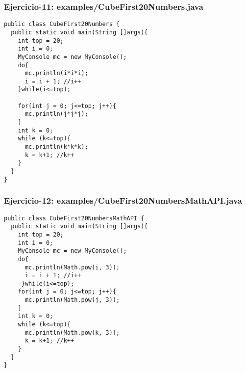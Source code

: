 \documentclass[xcolor=dvipsnames,dvip,notes=show,handout,table]{beamer}
\begin{document}


\begin{frame}[fragile]
\frametitle{Ejercicio-11: examples/CubeFirst20Numbers.java}
\tiny
\begin{lstlisting}
public class CubeFirst20Numbers {
  public static void main(String []args){
    int top = 20;
    int i = 0;
    MyConsole mc = new MyConsole();
    do{
      mc.println(i*i*i);
      i = i + 1; //i++
    }while(i<=top);

    for(int j = 0; j<=top; j++){
      mc.println(j*j*j);
    }
    int k = 0;
    while (k<=top){
      mc.println(k*k*k);
      k = k+1; //k++
    }
  }
}
\end{lstlisting}
\end{frame}




\begin{frame}[fragile]
\frametitle{Ejercicio-12: examples/CubeFirst20NumbersMathAPI.java}
\tiny
\begin{lstlisting}
public class CubeFirst20NumbersMathAPI {
  public static void main(String []args){
    int top = 20;
    int i = 0;
    MyConsole mc = new MyConsole();
    do{
      mc.println(Math.pow(i, 3));
      i = i + 1; //i++
     }while(i<=top);
    for(int j = 0; j<=top; j++){
      mc.println(Math.pow(j, 3));
    }
    int k = 0;
    while (k<=top){
      mc.println(Math.pow(k, 3));
      k = k+1; //k++
    }
  }
}
\end{lstlisting}
\end{frame}



\end{document}
